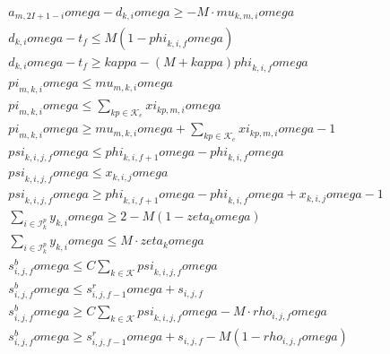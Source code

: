 \begin{align}
  & a_{m , 2 I + 1 - i} \mathit{omega} - d_{k , i} \mathit{omega} \geq - M \cdot \mathit{mu}_{k , m , i} \mathit{omega} \tag{eq\_0082\_b} \\
  & d_{k , i} \mathit{omega} - t_{f} \leq M \left(1 - \mathit{phi}_{k , i , f} \mathit{omega}\right) \tag{eq\_0084\_a} \\
  & d_{k , i} \mathit{omega} - t_{f} \geq \mathit{kappa} - \left(M + \mathit{kappa}\right) \mathit{phi}_{k , i , f} \mathit{omega} \tag{eq\_0084\_b} \\
  & \mathit{pi}_{m , k , i} \mathit{omega} \leq \mathit{mu}_{m , k , i} \mathit{omega} \tag{eq\_0085\_a} \\
  & \mathit{pi}_{m , k , i} \mathit{omega} \leq \sum_{kp \in \mathcal{K}_{e}} \mathit{xi}_{kp , m , i} \mathit{omega} \tag{eq\_0085\_b} \\
  & \mathit{pi}_{m , k , i} \mathit{omega} \geq \mathit{mu}_{m , k , i} \mathit{omega} + \sum_{kp \in \mathcal{K}_{e}} \mathit{xi}_{kp , m , i} \mathit{omega} - 1 \tag{eq\_0085\_c} \\
  & \mathit{psi}_{k , i , j , f} \mathit{omega} \leq \mathit{phi}_{k , i , f + 1} \mathit{omega} - \mathit{phi}_{k , i , f} \mathit{omega} \tag{eq\_0087\_a} \\
  & \mathit{psi}_{k , i , j , f} \mathit{omega} \leq x_{k , i , j} \mathit{omega} \tag{eq\_0087\_b} \\
  & \mathit{psi}_{k , i , j , f} \mathit{omega} \geq \mathit{phi}_{k , i , f + 1} \mathit{omega} - \mathit{phi}_{k , i , f} \mathit{omega} + x_{k , i , j} \mathit{omega} - 1 \tag{eq\_0087\_c} \\
  & \sum_{i \in \mathcal{I}_{k}^{p}} y_{k , i} \mathit{omega} \geq 2 - M \left(1 - \mathit{zeta}_{k} \mathit{omega}\right) \tag{eq\_0088\_a} \\
  & \sum_{i \in \mathcal{I}_{k}^{p}} y_{k , i} \mathit{omega} \leq M \cdot \mathit{zeta}_{k} \mathit{omega} \tag{eq\_0088\_b} \\
  & s_{i , j , f}^{b} \mathit{omega} \leq C \sum_{k \in \mathcal{K}} \mathit{psi}_{k , i , j , f} \mathit{omega} \tag{eq\_0090\_a} \\
  & s_{i , j , f}^{b} \mathit{omega} \leq s_{i , j , f - 1}^{r} \mathit{omega} + s_{i , j , f} \tag{eq\_0090\_b} \\
  & s_{i , j , f}^{b} \mathit{omega} \geq C \sum_{k \in \mathcal{K}} \mathit{psi}_{k , i , j , f} \mathit{omega} - M \cdot \mathit{rho}_{i , j , f} \mathit{omega} \tag{eq\_0090\_c} \\
  & s_{i , j , f}^{b} \mathit{omega} \geq s_{i , j , f - 1}^{r} \mathit{omega} + s_{i , j , f} - M \left(1 - \mathit{rho}_{i , j , f} \mathit{omega}\right) \tag{eq\_0090\_d} \\
\end{align}
